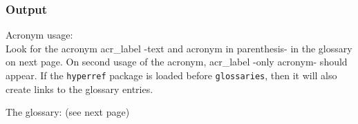 \subsubsection{Output}

Acronym usage:\\
Look for the acronym \gls{acr_label} -text and acronym
in parenthesis- in the glossary on next page. On
second usage of the acronym, \gls{acr_label} -only
acronym- should appear. If the \texttt{hyperref}
package is loaded before \texttt{glossaries},
then it will also create links to the glossary entries.


The glossary: (see next page)
\printglossary
